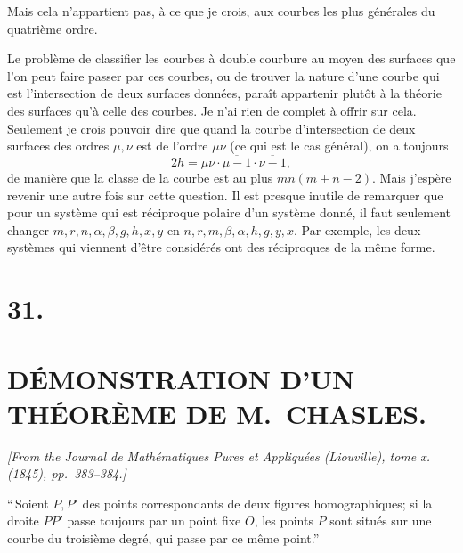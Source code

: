 \documentclass[11pt]{article}
\begin{document}
\newpage
\setcounter{page}{211}

Mais cela n'appartient pas, \`a ce que je crois, aux courbes les plus g\'en\'erales du quatri\`eme ordre.

Le probl\`eme de classifier les courbes \`a double courbure au moyen des surfaces que l'on peut faire passer par ces courbes, ou de trouver la nature d'une courbe qui est l'intersection de deux surfaces donn\'ees, para\^it appartenir plut\^ot \`a la th\'eorie des surfaces qu'\`a celle des courbes. Je n'ai rien de complet \`a offrir sur cela. Seulement je crois pouvoir dire que quand la courbe d'intersection de deux surfaces des ordres $\mu, \nu$ est de l'ordre $\mu\nu$ (ce qui est le cas g\'en\'eral), on a toujours
\[
2h = \mu\nu\cdot\overline{\mu - 1}\cdot\overline{\nu - 1},
\]
de mani\`ere que la classe de la courbe est au plus $mn(m+n-2)$. Mais j'esp\`ere revenir une autre fois sur cette question. Il est presque inutile de remarquer que pour un syst\`eme qui est r\'eciproque polaire d'un syst\`eme donn\'e, il faut seulement changer $m, r, n, \alpha, \beta, g, h, x, y$ en $n, r, m, \beta, \alpha, h, g, y, x$. Par exemple, les deux syst\`emes qui viennent d'\^etre consid\'er\'es ont des r\'eciproques de la m\^eme forme.

\newpage
\section*{31.}
\section*{D\'EMONSTRATION D'UN TH\'EOR\`EME DE M.~CHASLES.}

\textit{[From the Journal de Math\'ematiques Pures et Appliqu\'ees (Liouville), tome x. (1845), pp.~383--384.]}

\bigskip
\setcounter{page}{212}

``\,Soient $P, P'$ des points correspondants de deux figures homographiques; si la droite $PP'$ passe toujours par un point fixe $O$, les points $P$ sont situ\'es sur une courbe du troisi\`eme degr\'e, qui passe par ce m\^eme point.''
\end{document}
